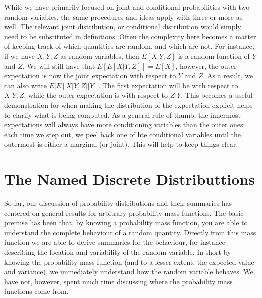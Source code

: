\documentclass[
  letterpaper,
  DIV=11,
  numbers=noendperiod]{scrreprt}
\begin{document}
While we have primarily focused on joint and conditional probabilities
with two random variables, the same procedures and ideas apply with
three or more as well. The relevant joint distribution, or conditional
distribution would simply need to be substituted in definitions. Often
the complexity here becomes a matter of keeping track of which
quantities are random, and which are not. For instance, if we have
\(X,Y,Z\) as random variables, then \(E[X|Y,Z]\) is a random function of
\(Y\) and \(Z\). We will still have that \(E[E[X|Y,Z]] = E[X]\),
however, the outer expectation is now the joint expectation with respect
to \(Y\) and \(Z\). As a result, we can also write \(E[E[X|Y,Z]|Y]\).
The first expectation will be with respect to \(X|Y,Z\), while the outer
expectation is with respect to \(Z|Y\). This becomes a useful
demonstration for when making the distribution of the expectation
explicit helps to clarify what is being computed. As a general rule of
thumb, the innermost expectations will always have more conditioning
variables than the outer ones: each time we step out, we peel back one
of hte conditional variables until the outermost is either a marginal
(or joint). This will help to keep things clear.

\chapter{The Named Discrete
Distributtions}\label{the-named-discrete-distributtions}

So far, our discussion of probability distributions and their summaries
has centered on general results for arbitrary probability mass
functions. The basic premise has been that, by knowing a probability
mass function, you are able to understand the complete behaviour of a
random quantity. Directly from this mass function we are able to derive
summaries for the behaviour, for instance describing the location and
variability of the random variable. In short by knowing the probability
mass function (and to a lesser extent, the expected value and variance),
we immediately understand how the random variable behaves. We have not,
however, spent much time discussing where the probability mass functions
come from.
\end{document}
